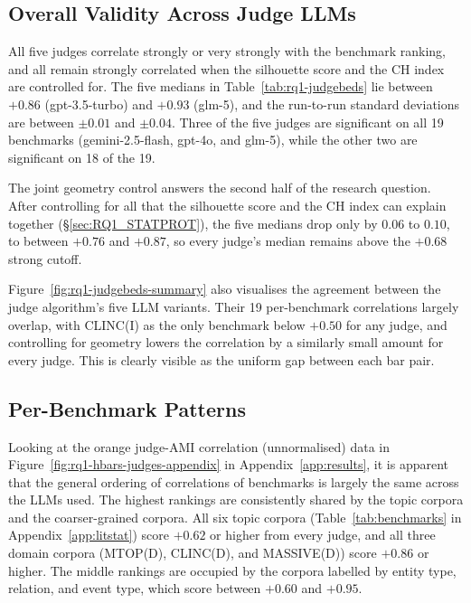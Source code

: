 \documentclass[11pt,a4paper,oneside]{report}
\begin{document}
\subsection{Overall Validity Across Judge LLMs}

All five judges correlate strongly or very strongly with the benchmark ranking, and all remain strongly correlated when the silhouette score and the CH index are controlled for. The five medians in Table~\ref{tab:rq1-judgebeds} lie between $+0.86$ ({\small\ttfamily gpt-3.5-turbo}) and $+0.93$ ({\small\ttfamily glm-5}), and the run-to-run standard deviations are between $\pm 0.01$ and $\pm 0.04$. Three of the five judges are significant on all 19 benchmarks ({\small\ttfamily gemini-2.5-flash}, {\small\ttfamily gpt-4o}, and {\small\ttfamily glm-5}), while the other two are significant on 18 of the 19.

The joint geometry control answers the second half of the research question. After controlling for all that the silhouette score and the CH index can explain together (\S\ref{sec:RQ1_STATPROT}), the five medians drop only by $0.06$ to $0.10$, to between $+0.76$ and $+0.87$, so every judge's median remains above the $+0.68$ strong cutoff.

Figure~\ref{fig:rq1-judgebeds-summary} also visualises the agreement between the judge algorithm's five LLM variants. Their 19 per-benchmark correlations largely overlap, with CLINC(I) as the only benchmark below $+0.50$ for any judge, and controlling for geometry lowers the correlation by a similarly small amount for every judge. This is clearly visible as the uniform gap between each bar pair.

\subsection{Per-Benchmark Patterns}

Looking at the orange judge-AMI correlation (unnormalised) data in Figure~\ref{fig:rq1-hbars-judges-appendix} in Appendix~\ref{app:results}, it is apparent that the general ordering of correlations of benchmarks is largely the same across the LLMs used. The highest rankings are consistently shared by the topic corpora and the coarser-grained corpora. All six topic corpora (Table~\ref{tab:benchmarks} in Appendix~\ref{app:litstat}) score $+0.62$ or higher from every judge, and all three domain corpora (MTOP(D), CLINC(D), and MASSIVE(D)) score $+0.86$ or higher. The middle rankings are occupied by the corpora labelled by entity type, relation, and event type, which score between $+0.60$ and $+0.95$.
\end{document}
